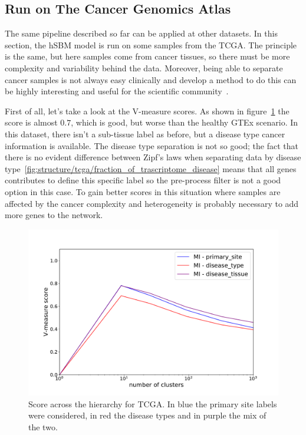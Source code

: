\subsection{Run on The Cancer Genomics Atlas}
The same pipeline described so far can be applied at other datasets. In this section, the hSBM model is run on some samples from the TCGA. The principle is the same, but here samples come from cancer tissues, so there must be more complexity and variability behind the data. Moreover, being able to separate cancer samples is not always easy clinically and develop a method to do this can be highly interesting and useful for the scientific community~\cite{Farver2018}. 

First of all, let's take a look at the V-measure scores. As shown in figure~\ref{fig:topic/tcga/metric} the score is almost $0.7$, which is good, but worse than the healthy GTEx scenario. In this dataset, there isn't a sub-tissue label as before, but a disease type cancer information is available. The disease type separation is not so good; the fact that there is no evident difference between Zipf's laws when separating data by disease type~\ref{fig:structure/tcga/fraction_of_trascriptome_disease} means that all genes contributes to define this specific label so the pre-process filter is not a good option in this case. To gain better scores in this situation where samples are affected by the cancer complexity and heterogeneity is probably necessary to add more genes to the network.
\begin{figure}[htb!]
    \centering
    \includegraphics[width=0.8\linewidth]{pictures/topic/tcga/metric.pdf}
    \caption{Score across the hierarchy for TCGA. In blue the primary site labels were considered, in red the disease types and in purple the mix of the two.}
    \label{fig:topic/tcga/metric}
\end{figure}

